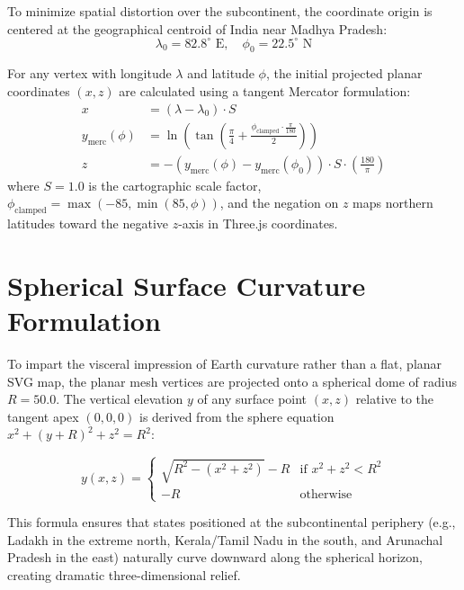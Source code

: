 \documentclass[11pt,a4paper]{report}
\begin{document}
To minimize spatial distortion over the subcontinent, the coordinate origin is centered at the geographical centroid of India near Madhya Pradesh:
\begin{equation}
    \lambda_0 = 82.8^\circ\text{ E}, \quad \phi_0 = 22.5^\circ\text{ N}
\end{equation}

For any vertex with longitude $\lambda$ and latitude $\phi$, the initial projected planar coordinates $(x, z)$ are calculated using a tangent Mercator formulation:
\begin{align}
    x &= (\lambda - \lambda_0) \cdot S \\
    y_{\text{merc}}(\phi) &= \ln\left( \tan\left( \frac{\pi}{4} + \frac{\phi_{\text{clamped}} \cdot \frac{\pi}{180}}{2} \right) \right) \\
    z &= -\left( y_{\text{merc}}(\phi) - y_{\text{merc}}(\phi_0) \right) \cdot S \cdot \left(\frac{180}{\pi}\right)
\end{align}
where $S = 1.0$ is the cartographic scale factor, $\phi_{\text{clamped}} = \max(-85, \min(85, \phi))$, and the negation on $z$ maps northern latitudes toward the negative $z$-axis in Three.js coordinates.

\section{Spherical Surface Curvature Formulation}
To impart the visceral impression of Earth curvature rather than a flat, planar SVG map, the planar mesh vertices are projected onto a spherical dome of radius $R = 50.0$. The vertical elevation $y$ of any surface point $(x, z)$ relative to the tangent apex $(0, 0, 0)$ is derived from the sphere equation $x^2 + (y + R)^2 + z^2 = R^2$:

\begin{equation}
    y(x, z) = 
    \begin{cases}
        \sqrt{R^2 - (x^2 + z^2)} - R & \text{if } x^2 + z^2 < R^2 \\
        -R & \text{otherwise}
    \end{cases}
    \label{eq:spherical_drop}
\end{equation}

This formula ensures that states positioned at the subcontinental periphery (e.g., Ladakh in the extreme north, Kerala/Tamil Nadu in the south, and Arunachal Pradesh in the east) naturally curve downward along the spherical horizon, creating dramatic three-dimensional relief.
\end{document}
